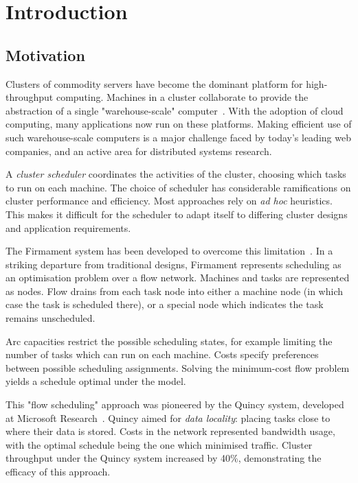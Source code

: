 \chapter{Introduction} \label{chap:intro}


\section{Motivation} \label{sec:intro-motivation}
Clusters of commodity servers have become the dominant platform for high-throughput computing. Machines in a cluster collaborate to provide the abstraction of a single "warehouse-scale" computer~\cite{WarehouseScale:2009}. With the adoption of cloud computing, many applications now run on these platforms. Making efficient use of such warehouse-scale computers is a major challenge faced by today's leading web companies, and an active area for distributed systems research.

A \emph{cluster scheduler} coordinates the activities of the cluster, choosing which tasks to run on each machine. The choice of scheduler has considerable ramifications on cluster performance and efficiency. Most approaches rely on \emph{ad hoc} heuristics. This makes it difficult for the scheduler to adapt itself to differing cluster designs and application requirements.

The Firmament system has been developed to overcome this limitation\footnotemark~\cite{Schwarzkopf:2015}. In a striking departure from traditional designs, Firmament represents scheduling as an optimisation problem over a flow network. Machines and tasks are represented as nodes. Flow drains from each task node into either a machine node (in which case the task is scheduled there), or a special node which indicates the task remains unscheduled.

Arc capacities restrict the possible scheduling states, for example limiting the number of tasks which can run on each machine. Costs specify preferences between possible scheduling assignments. Solving the minimum-cost flow problem yields a schedule optimal under the model.

This "flow scheduling" approach was pioneered by the Quincy system, developed at Microsoft Research~\cite{Isard:2009}. Quincy aimed for \emph{data locality}: placing tasks close to where their data is stored. Costs in the network represented bandwidth usage, with the optimal schedule being the one which minimised traffic. Cluster throughput under the Quincy system increased by 40\%, demonstrating the efficacy of this approach.

